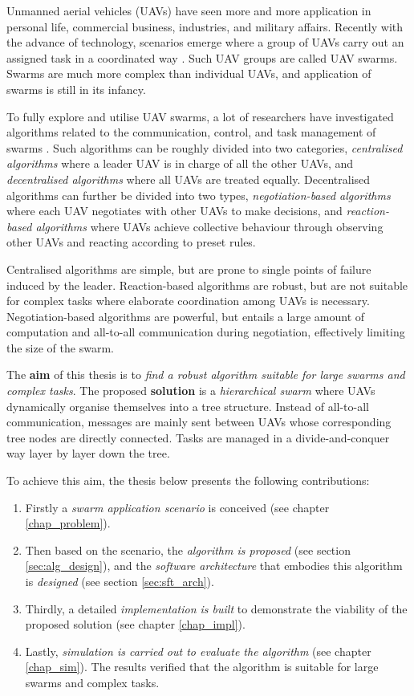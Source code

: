 Unmanned aerial vehicles (UAVs) have seen more and more application in personal life,
commercial business, industries, and military affairs.
Recently with the advance of technology, scenarios emerge where a group of UAVs
carry out an assigned task in a coordinated way \parencite{Dimakos2024, Javed2024, Ouyang2023}.
Such UAV groups are called UAV swarms.
Swarms are much more complex than individual UAVs,
and application of swarms is still in its infancy.

To fully explore and utilise UAV swarms, a lot of researchers have investigated algorithms
related to the communication, control, and task management of swarms
\parencite{Javaid2023, Zhou2020}.
Such algorithms can be roughly divided into two categories,
\textit{centralised algorithms} where a leader UAV is in charge of all the other UAVs,
and \textit{decentralised algorithms} where all UAVs are treated equally.
Decentralised algorithms can further be divided into two types,
\textit{negotiation-based algorithms} where each UAV negotiates with other UAVs to make decisions,
and \textit{reaction-based algorithms} where UAVs achieve collective behaviour through
observing other UAVs and reacting according to preset rules.

Centralised algorithms are simple,
but are prone to single points of failure induced by the leader.
Reaction-based algorithms are robust,
but are not suitable for complex tasks where elaborate coordination among UAVs is necessary.
Negotiation-based algorithms are powerful,
but entails a large amount of computation and all-to-all communication during negotiation,
effectively limiting the size of the swarm.

The \textbf{aim} of this thesis is
to \textit{find a robust algorithm suitable for large swarms and complex tasks}.
The proposed \textbf{solution} is
a \textit{hierarchical swarm} where UAVs dynamically organise themselves into a tree structure.
Instead of all-to-all communication, messages are mainly sent between UAVs
whose corresponding tree nodes are directly connected.
Tasks are managed in a divide-and-conquer way layer by layer down the tree.

To achieve this aim, the thesis below presents the following contributions:
\begin{enumerate}
    \item Firstly a \textit{swarm application scenario} is conceived (see chapter \ref{chap_problem}).
    \item Then based on the scenario,
          the \textit{algorithm is proposed} (see section \ref{sec:alg_design}),
          and the \textit{software architecture} that embodies this algorithm is \textit{designed}
           (see section \ref{sec:sft_arch}).
    \item Thirdly, a detailed \textit{implementation is built}
          to demonstrate the viability of the proposed solution (see chapter \ref{chap_impl}).
    \item Lastly,
          \textit{simulation is carried out to evaluate the algorithm} (see chapter \ref{chap_sim}).
          The results verified that the algorithm is suitable for large swarms and complex tasks. 
\end{enumerate}